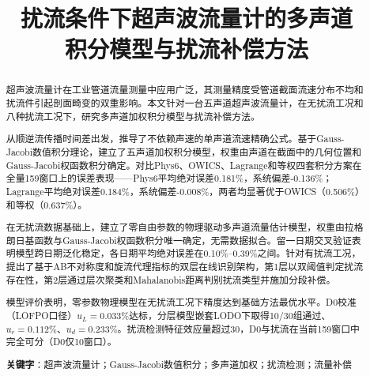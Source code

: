 \documentclass[12pt,a4paper]{ctexart}
\title{扰流条件下超声波流量计的多声道\\积分模型与扰流补偿方法}
\author{}
\date{}
\begin{document}
\maketitle

\begin{abstract}
超声波流量计在工业管道流量测量中应用广泛，其测量精度受管道截面流速分布不均和扰流件引起剖面畸变的双重影响。本文针对一台五声道超声波流量计，在无扰流工况和八种扰流工况下，研究多声道加权积分模型与扰流补偿方法。

从顺逆流传播时间差出发，推导了不依赖声速的单声道流速精确公式。基于Gauss-Jacobi数值积分理论，建立了五声道加权积分模型，权重由声道在截面中的几何位置和Gauss-Jacobi权函数积分确定。对比Phys6、OWICS、Lagrange和等权四套积分方案在全量159窗口上的误差表现——Phys6平均绝对误差0.181\%，系统偏差-0.136\%；Lagrange平均绝对误差0.184\%，系统偏差-0.008\%，两者均显著优于OWICS（0.506\%）和等权（0.637\%）。

在无扰流数据基础上，建立了零自由参数的物理驱动多声道流量估计模型，权重由拉格朗日基函数与Gauss-Jacobi权函数积分唯一确定，无需数据拟合。留一日期交叉验证表明模型跨日期泛化稳定，各日期平均绝对误差在0.10\%--0.39\%之间。针对有扰流工况，提出了基于AB不对称度和旋流代理指标的双层在线识别架构，第1层以双阈值判定扰流存在性，第2层通过层次聚类和Mahalanobis距离判别扰流类型并施加分段补偿。

模型评价表明，零参数物理模型在无扰流工况下精度达到基础方法最优水平。D0校准（LOFPO口径）$u_L=0.033\%$达标，分层模型嵌套LODO下取得10/30组通过、$u_r=0.112\%$、$u_d=0.233\%$。扰流检测特征效应量超过30，D0与扰流在当前159窗口中完全可分（D0仅10窗口）。

\medskip
\noindent\textbf{关键字}：超声波流量计；Gauss-Jacobi数值积分；多声道加权；扰流检测；流量补偿
\end{abstract}

\tableofcontents
\newpage









\end{document}
